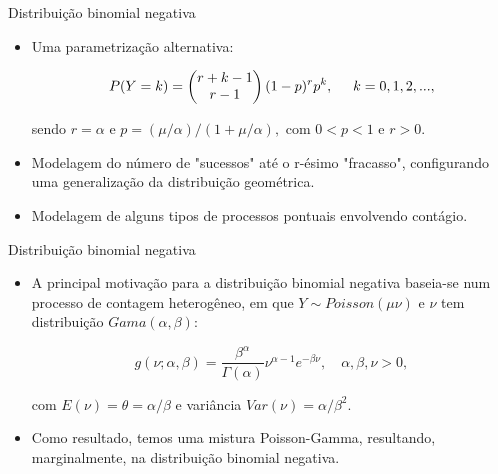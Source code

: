 \documentclass[10pt, aspectratio=169]{beamer}
\begin{document}


\begin{frame}{Distribuição binomial negativa} 

\begin{itemize}

\item Uma parametrização alternativa:

\vspace{0.5cm}

$$
P(Y=k) = \left ( \begin{matrix}
r+k-1\\ 
r-1
\end{matrix} \right ) (1-p)^rp^k, \hspace{0,5cm} k=0,1,2,...,
$$

\vspace{0.5cm}

sendo $r=\alpha$ e $p=(\mu/\alpha)/(1+\mu/\alpha),$ com $0<p<1$ e $r>0$.  
\vspace{0.5cm}

\item Modelagem do número de "sucessos" até o r-ésimo "fracasso",
configurando uma generalização da distribuição geométrica.

\vspace{0.5cm}

\item Modelagem de alguns tipos de processos pontuais envolvendo contágio.

\end{itemize}

\end{frame}





\begin{frame}{Distribuição binomial negativa} 

\begin{itemize}

\item A principal motivação para a distribuição binomial negativa baseia-se num processo de contagem heterogêneo, em que $Y \sim Poisson( \mu \nu)$ e $\nu$ tem distribuição $Gama(\alpha, \beta):$

$$
g\left ( \nu;\alpha,\beta \right )=\frac{\beta^{\alpha}}{\Gamma\left ( \alpha \right )}\nu^{\alpha-1}e^{-\beta \nu},\quad \alpha, \beta, \nu>0,
$$

com $E(\nu)=\theta=\alpha /\beta$ e variância $Var(\nu)=\alpha /\beta^2.$


\vspace{0.5cm}

\item Como resultado, temos uma mistura Poisson-Gamma, resultando, marginalmente, na distribuição binomial negativa.


\end{itemize}

\end{frame}
\end{document}

